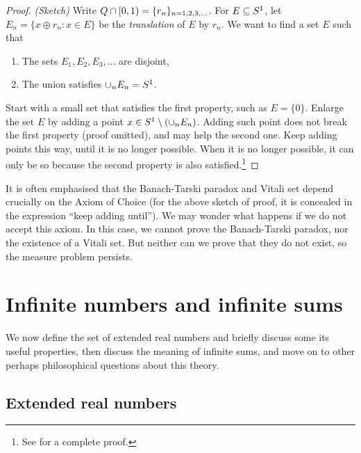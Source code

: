 \documentclass[
]{book}
\theoremstyle{definition}
\theoremstyle{remark}
\newenvironment{remark}{\pushQED{\qed}\renewcommand{\qedsymbol}{\scriptsize$\triangle$}\remarkx}{\popQED\endremarkx}
\let\mathbb\relax %
\newcommand{\Q}{\mathbb{Q}}
\newcommand{\SSS}{\mathbb{S}}
\begin{document}
\begin{proof}
\emph{(Sketch)} Write \(\Q \cap [0,1) = \{r_n\}_{n=1,2,3,\dots}\). For
\(E \subseteq \SSS^1\), let \(E_n = \{ x \oplus r_n : x \in E \}\) be the
\emph{translation} of \(E\) by \(r_n\). We want to find a set \(E\) such that

\begin{enumerate}
\def\labelenumi{\arabic{enumi}.}
\item
  The sets \(E_1,E_2,E_3,\dots\) are disjoint,
\item
  The union satisfies \(\cup_n E_n = \SSS^1\).
\end{enumerate}

Start with a small set that satisfies the first property, such as
\(E = \{0\}\). Enlarge the set \(E\) by adding a point
\(x \in \SSS^1 \setminus (\cup_n E_n)\). Adding such point does not break
the first property (proof omitted), and may help the second one. Keep
adding points this way, until it is no longer possible. When it is no
longer possible, it can only be so because the second property is also
satisfied.\footnote{See \citep[ 1.4.9]{Cohn13} for a complete proof.}
\end{proof}

\begin{remark}
It is often emphasised that the Banach-Tarski paradox and Vitali set
depend crucially on the Axiom of Choice (for the above sketch of proof,
it is concealed in the expression ``keep adding until''). We may wonder
what happens if we do not accept this axiom. In this case, we cannot
prove the Banach-Tarski paradox, nor the existence of a Vitali set. But
neither can we prove that they do not exist, so the measure problem
persists.
\end{remark}

\hypertarget{sub:infinitenumbers}{%
\section{Infinite numbers and infinite sums}\label{sub:infinitenumbers}}

We now define the set of extended real numbers and briefly discuss some
its useful properties, then discuss the meaning of infinite sums, and
move on to other perhaps philosophical questions about this theory.

\hypertarget{subsub:extended}{%
\subsection{Extended real numbers}\label{subsub:extended}}
\end{document}
